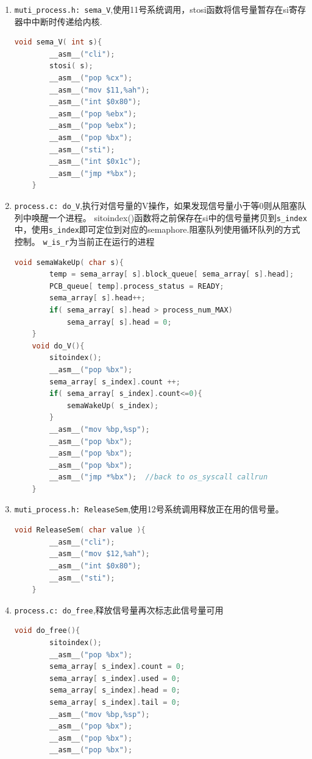 \documentclass[a4paper]{article}
\begin{document}
{\begin{enumerate}
{\begin{lstlisting}[language={C}]
		__asm__("mov %bp,%sp");
		__asm__("pop %bx");
		__asm__("pop %bx");
		__asm__("pop %bx");
		__asm__("jmp *%bx");  //back to os_syscall callrun
	}
 	\end{lstlisting}}
	\item \verb|muti_process.h: sema_V|,使用11号系统调用，stosi函数将信号量暂存在si寄存器中中断时传递给内核.
	{\scriptsize\begin{lstlisting}[language={C}]
	void sema_V( int s){
		__asm__("cli");
		stosi( s);
		__asm__("pop %cx");
		__asm__("mov $11,%ah");
		__asm__("int $0x80");
		__asm__("pop %ebx");
		__asm__("pop %ebx");
		__asm__("pop %bx");
		__asm__("sti");
		__asm__("int $0x1c");
		__asm__("jmp *%bx");
	}
 	\end{lstlisting}}
	\item \verb|process.c: do_V|,执行对信号量的V操作，如果发现信号量小于等0则从阻塞队列中唤醒一个进程。
	sitoindex()函数将之前保存在si中的信号量拷贝到\verb|s_index|中，使用\verb|s_index|即可定位到对应的semaphore.阻塞队列使用循环队列的方式控制。
	\verb|w_is_r|为当前正在运行的进程
	{\scriptsize\begin{lstlisting}[language={C}]
	void semaWakeUp( char s){
		temp = sema_array[ s].block_queue[ sema_array[ s].head];
		PCB_queue[ temp].process_status = READY;
		sema_array[ s].head++;
		if( sema_array[ s].head > process_num_MAX)
			sema_array[ s].head = 0;
	}
	void do_V(){
		sitoindex();
		__asm__("pop %bx");
		sema_array[ s_index].count ++;
		if( sema_array[ s_index].count<=0){
			semaWakeUp( s_index);
		}
		__asm__("mov %bp,%sp");
		__asm__("pop %bx");
		__asm__("pop %bx");
		__asm__("pop %bx");
		__asm__("jmp *%bx");  //back to os_syscall callrun
	}
 	\end{lstlisting}}
	\item \verb|muti_process.h: ReleaseSem|,使用12号系统调用释放正在用的信号量。
	{\scriptsize\begin{lstlisting}[language={C}]
	void ReleaseSem( char value ){
		__asm__("cli");
		__asm__("mov $12,%ah");
		__asm__("int $0x80");
		__asm__("sti");
	}
 	\end{lstlisting}}
	\item \verb|process.c: do_free|,释放信号量再次标志此信号量可用
	{\scriptsize\begin{lstlisting}[language={C}]
	void do_free(){
		sitoindex();
		__asm__("pop %bx");
		sema_array[ s_index].count = 0;
		sema_array[ s_index].used = 0;
		sema_array[ s_index].head = 0;
		sema_array[ s_index].tail = 0;
		__asm__("mov %bp,%sp");
		__asm__("pop %bx");
		__asm__("pop %bx");
		__asm__("pop %bx");

\end{lstlisting}}
\end{enumerate}}
\end{document}
